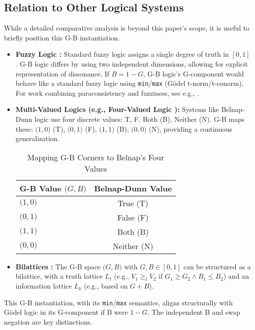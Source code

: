 \documentclass[11pt]{article}
\newcommand{\GB}[2]{\bigl(#1,#2\bigr)} %
\theoremstyle{remark}
\begin{document}
\subsection{Relation to Other Logical Systems} \label{sec:other_logics_main}
While a detailed comparative analysis is beyond this paper's scope, it is useful to briefly position this G-B instantiation.
\begin{itemize}
    \item \textbf{Fuzzy Logic \cite{zadeh1965}:} Standard fuzzy logic assigns a single degree of truth in $[0,1]$. G-B logic differs by using two independent dimensions, allowing for explicit representation of dissonance. If $B = 1-G$, G-B logic's G-component would behave like a standard fuzzy logic using \texttt{min}/\texttt{max} (Gödel t-norm/t-conorm). For work combining paraconsistency and fuzziness, see e.g., \cite{arieli2021}.
    \item \textbf{Multi-Valued Logics (e.g., Four-Valued Logic \cite{belnap1977}):} Systems like Belnap-Dunn logic use four discrete values: T, F, Both (B), Neither (N). G-B maps these: $\GB{1}{0}$ (T), $\GB{0}{1}$ (F), $\GB{1}{1}$ (B), $\GB{0}{0}$ (N), providing a continuous generalization.
    \begin{table}[H] \centering \caption{Mapping G-B Corners to Belnap's Four Values} \label{tab:belnap_map_main}
    \begin{tabular}{@{}lc@{}} \toprule
    \textbf{G-B Value $\GB{G}{B}$} & \textbf{Belnap-Dunn Value} \\ \midrule
    $\GB{1}{0}$ & True (T) \\
    $\GB{0}{1}$ & False (F) \\
    $\GB{1}{1}$ & Both (B) \\
    $\GB{0}{0}$ & Neither (N) \\ \bottomrule
    \end{tabular} \end{table}
    \item \textbf{Bilattices \cite{ginsberg1988, fitting1991}:} The G-B space $\GB{G}{B}$ with $G,B \in [0,1]$ can be structured as a bilattice, with a truth lattice $L_t$ (e.g., $V_1 \ge_t V_2$ if $G_1 \ge G_2 \land B_1 \le B_2$) and an information lattice $L_k$ (e.g., based on $G+B$).
\end{itemize}
This G-B instantiation, with its \texttt{min}/\texttt{max} semantics, aligns structurally with Gödel logic in its G-component if B were $1-G$. The independent B and swap negation are key distinctions.
\end{document}
